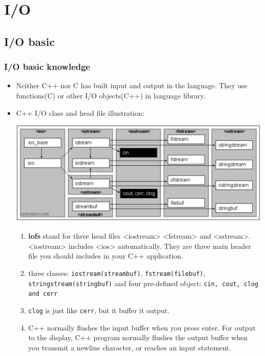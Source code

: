 \documentclass[a4paper,11pt,twoside]{book}
\begin{document}
\chapter{I/O}
\section{I/O basic}
\subsection{I/O basic knowledge}
\begin{itemize}
	\item Neither C++ nor C has built input and output in the language. They use functions(C) or other I/O objects(C++) in language library.
	
	\item C++ I/O class and head file illustration: 
	\begin{center}
			\includegraphics[scale=0.5]{pics/io.png}
	\end{center}

	\begin{enumerate}
		
		\item \textbf{iofs} stand for three head files <iostream> <fstream> and <sstream>. <iostream> includes <ios> automatically. They are three main header file you should includes in your C++ application.
		
		\item three classes: \texttt{iostream(streambuf)}, \texttt{fstream(filebuf)}, \texttt{stringstream(stringbuf)} and four pre-defined object: \texttt{cin, cout, clog and cerr} 
		
		\item \texttt{clog} is just like \texttt{cerr}, but it buffer it output.
		
		\item C++ normally flushes the input buffer when you press enter. For output to the display, C++ program normally flushes the output buffer when you transmit a newline character, or reaches an input statement.
		

\end{enumerate}
\end{itemize}
\end{document}
